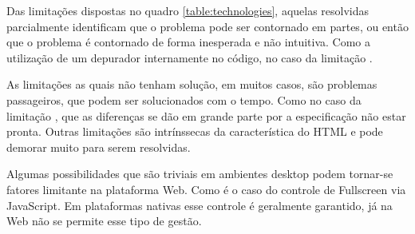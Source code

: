 Das limitações dispostas no quadro \ref{table:technologies},
aquelas resolvidas parcialmente identificam que o problema
pode ser contornado em partes, ou então que o problema é
contornado de forma inesperada e não intuitiva. Como a utilização
de um depurador internamente no código, no caso da limitação
.

As limitações as quais não tenham solução, em muitos casos, são
problemas passageiros, que podem ser solucionados com o tempo. Como no
caso da limitação , que as diferenças
se dão em grande parte por a especificação não estar pronta. Outras
limitações são intrínssecas da característica do HTML e pode
demorar muito para serem resolvidas.

Algumas possibilidades que são triviais em ambientes desktop podem
tornar-se fatores limitante na plataforma Web. Como é o caso do
controle de Fullscreen via JavaScript. Em plataformas nativas esse
controle é geralmente garantido, já na Web não se permite esse
tipo de gestão.
